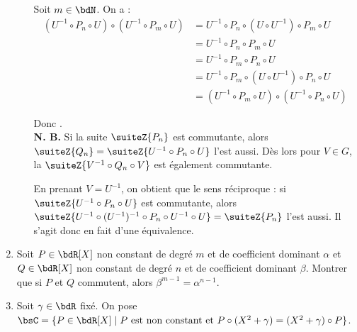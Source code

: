 \documentclass[a4paper,french,bookmarks]{article}
\begin{document}
\begin{enumerate}
\begin{enumerate}
{            Soit $m \in \bdN$. On a :
            \begin{align*}
                 \left(U^{-1} \circ P_n \circ U\right)\circ\left(U^{-1} \circ P_m \circ U\right) &= U^{-1} \circ P_n \circ \left(U\circ U^{-1}\right) \circ P_m \circ U\\
                 &= U^{-1} \circ P_n \circ P_m \circ U\\
                 &= U^{-1} \circ P_m \circ P_n \circ U\\
                 &= U^{-1} \circ P_m \circ \left(U\circ U^{-1}\right) \circ P_n \circ U\\
                 &= \left(U^{-1} \circ P_m \circ U\right)\circ\left(U^{-1} \circ P_n \circ U\right)
            \end{align*}
            
            Donc .\\
            
            \textbf{N. B.} Si la suite $\suiteZ{P_n}$ est commutante, alors $\suiteZ{Q_n} = \suiteZ{U^{-1} \circ P_n \circ U}$ l'est aussi. Dès lors pour $V \in G$, la $\suiteZ{V^{-1} \circ Q_n \circ V}$ est également commutante. 
            
            En prenant $V = U^{-1}$, on obtient que le sens réciproque : si $\suiteZ{U^{-1} \circ P_n \circ U}$ est commutante, alors $\suiteZ{U^{-1} \circ (U^{-1})^{-1} \circ P_n \circ U^{-1} \circ U} = \suiteZ{P_n}$ l'est aussi. Il s'agit donc en fait d'une équivalence.
        }
        
    \end{enumerate}
    
    \item\label{question2:5} Soit $P \in \bdR[X]$ non constant de degré $m$ et de coefficient dominant $\alpha$ et $Q \in \bdR[X]$ non constant de degré $n$ et de coefficient dominant $\beta$. Montrer que si $P$ et $Q$ commutent, alors $\beta^{m-1} = \alpha^{n-1}$.
    
    
    \item\label{question2:6} Soit $\gamma \in \bdR$ fixé. On pose $\bsC = \{ P \in \bdR[X] \mid P \ \text{est non constant et} \ P \circ (X^2 + \gamma) = (X^2 + \gamma) \circ P\}$.
    

\end{enumerate}
\end{document}
